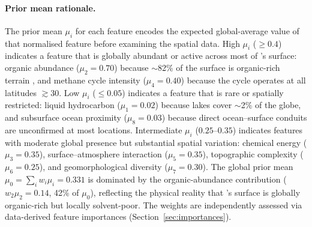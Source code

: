 \paragraph{Prior mean rationale.}
The prior mean $\mu_i$ for each feature encodes the expected global-average value of that normalised feature before examining the spatial data.  High $\mu_i$ ($\geq 0.4$) indicates a feature that is globally abundant or active across most of \titan{}'s surface: organic abundance ($\mu_2 = 0.70$) because $\sim$82\% of the surface is organic-rich terrain \citep{Malaska2025}, and methane cycle intensity ($\mu_4 = 0.40$) because the cycle operates at all latitudes $\gtrsim$30\textdegree{}.  Low $\mu_i$ ($\leq 0.05$) indicates a feature that is rare or spatially restricted: liquid hydrocarbon ($\mu_1 = 0.02$) because lakes cover $\sim$2\% of the globe, and subsurface ocean proximity ($\mu_8 = 0.03$) because direct ocean--surface conduits are unconfirmed at most locations.  Intermediate $\mu_i$ ($0.25$--$0.35$) indicates features with moderate global presence but substantial spatial variation: chemical energy ($\mu_3 = 0.35$), surface--atmosphere interaction ($\mu_5 = 0.35$), topographic complexity ($\mu_6 = 0.25$), and geomorphological diversity ($\mu_7 = 0.30$).  The global prior mean $\mu_0 = \sum_i w_i \mu_i = 0.331$ is dominated by the organic-abundance contribution ($w_2\mu_2 = 0.14$, 42\% of $\mu_0$), reflecting the physical reality that \titan{}'s surface is globally organic-rich but locally solvent-poor.  The weights are independently assessed via data-derived feature importances (Section~\ref{sec:importances}).


